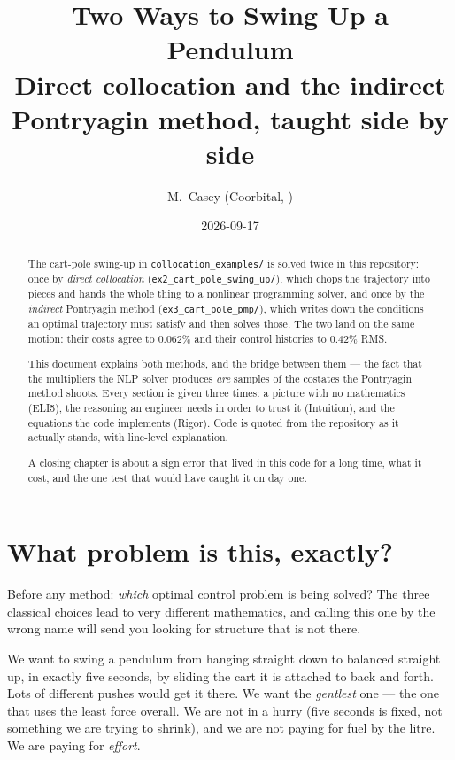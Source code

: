 \documentclass[11pt]{article}
\title{Two Ways to Swing Up a Pendulum\\
\large Direct collocation and the indirect Pontryagin method, taught side by side}
\author{M.~Casey \quad (Coorbital, \file{collocation\_examples/})}
\date{2026-09-17}
\newcommand{\file}[1]{\texttt{#1}}
\begin{document}
\maketitle

\begin{abstract}
The cart-pole swing-up in \file{collocation\_examples/} is solved twice in this
repository: once by \emph{direct collocation} (\file{ex2\_cart\_pole\_swing\_up/}),
which chops the trajectory into pieces and hands the whole thing to a nonlinear
programming solver, and once by the \emph{indirect} Pontryagin method
(\file{ex3\_cart\_pole\_pmp/}), which writes down the conditions an optimal
trajectory must satisfy and then solves those. The two land on the same motion:
their costs agree to $0.062\%$ and their control histories to $0.42\%$ RMS.

This document explains both methods, and the bridge between them --- the fact
that the multipliers the NLP solver produces \emph{are} samples of the costates
the Pontryagin method shoots. Every section is given three times: a picture with
no mathematics (ELI5), the reasoning an engineer needs in order to trust it
(Intuition), and the equations the code implements (Rigor). Code is quoted from
the repository as it actually stands, with line-level explanation.

A closing chapter is about a sign error that lived in this code for a long time,
what it cost, and the one test that would have caught it on day one.
\end{abstract}

\tableofcontents

\section{What problem is this, exactly?}

Before any method: \emph{which} optimal control problem is being solved? The
three classical choices lead to very different mathematics, and calling this one
by the wrong name will send you looking for structure that is not there.

\begin{eli}
We want to swing a pendulum from hanging straight down to balanced straight up,
in exactly five seconds, by sliding the cart it is attached to back and forth.
Lots of different pushes would get it there. We want the \emph{gentlest} one ---
the one that uses the least force overall. We are not in a hurry (five seconds
is fixed, not something we are trying to shrink), and we are not paying for fuel
by the litre. We are paying for \emph{effort}.
\end{eli}
\end{document}
